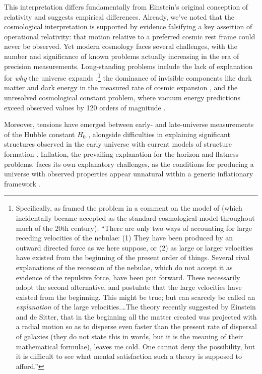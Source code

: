 \documentclass[aps,rmp,groupedaddress,twocolumn,10pt]{revtex4-2}
\begin{document}
This interpretation differs fundamentally from Einstein's original conception of relativity and suggests empirical differences. Already, we've noted that the cosmological interpretation is supported by evidence falsifying a key assertion of operational relativity: that motion relative to a preferred cosmic rest frame could never be observed. Yet modern cosmology faces several challenges, with the number and significance of known problems actually increasing in the era of precision measurements. Long-standing problems include the lack of explanation for \textit{why} the universe expands \cite{Eddington1933},\footnote{Specifically, as \citet{Eddington1933} framed the problem in a comment on the model of \citet{Einstein1932} (which incidentally became accepted as the standard cosmological model throughout much of the 20th century): ``There are only two ways of accounting for large receding velocities of the nebulae: (1) They have been produced by an outward directed force as we here suppose, or (2) as large or larger velocities have existed from the beginning of the present order of things. Several rival explanations of the recession of the nebulae, which do not accept it as evidence of the repulsive force, have been put forward. These necessarily adopt the second alternative, and postulate that the large velocities have existed from the beginning. This might be true; but can scarcely be called an \textit{explanation} of the large velocities.\ldots The theory recently suggested by Einstein and de Sitter, that in the beginning all the matter created was projected with a radial motion so as to disperse even faster than the present rate of dispersal of galaxies (they do not state this in words, but it is the meaning of their mathematical formulae), leaves me cold. One cannot deny the possibility, but it is difficult to see what mental satisfaction such a theory is supposed to afford.''} the dominance of invisible components like dark matter and dark energy in the measured rate of cosmic expansion \cite{Riess1998,Perlmutter1999}, and the unresolved cosmological constant problem, where vacuum energy predictions exceed observed values by 120 orders of magnitude \cite{Weinberg1989,Carroll1992}.

Moreover, tensions have emerged between early- and late-universe measurements of the Hubble constant $H_0$ \cite{Freedman2017,Freedman2023,Riess2024}, alongside difficulties in explaining significant structures observed in the early universe with current models of structure formation \cite{Haslbauer2022}. Inflation, the prevailing explanation for the horizon and flatness problems, faces its own explanatory challenges, as the conditions for producing a universe with observed properties appear unnatural within a generic inflationary framework \cite{Ijjas2014,Ijjas2017,Garfinkle2023}.
\end{document}

